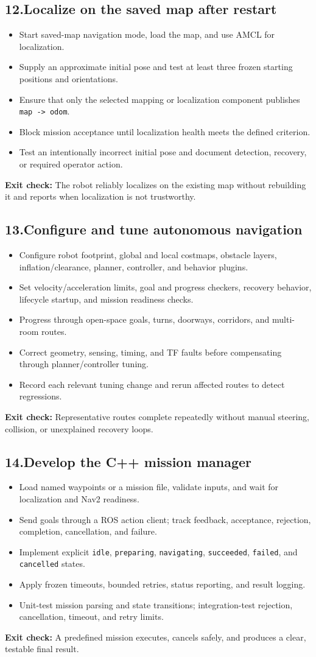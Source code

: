 \documentclass[10pt,a4paper]{article}
\newcommand{\cb}{\(\square\)}
\newcommand{\exitcheck}[1]{\vspace{2pt}\colorbox{PaleTeal}{\parbox{0.965\linewidth}{\textbf{Exit check:} #1}}}
\newcommand{\workstep}[2]{\subsection{\texorpdfstring{#1\quad #2}{#1\ #2}}}
\begin{document}
\workstep{12.}{Localize on the saved map after restart}
\begin{itemize}
  \item[\cb] Start saved-map navigation mode, load the map, and use AMCL for localization.
  \item[\cb] Supply an approximate initial pose and test at least three frozen starting positions and orientations.
  \item[\cb] Ensure that only the selected mapping or localization component publishes \texttt{map -> odom}.
  \item[\cb] Block mission acceptance until localization health meets the defined criterion.
  \item[\cb] Test an intentionally incorrect initial pose and document detection, recovery, or required operator action.
\end{itemize}
\exitcheck{The robot reliably localizes on the existing map without rebuilding it and reports when localization is not trustworthy.}

\workstep{13.}{Configure and tune autonomous navigation}
\begin{itemize}
  \item[\cb] Configure robot footprint, global and local costmaps, obstacle layers, inflation/clearance, planner, controller, and behavior plugins.
  \item[\cb] Set velocity/acceleration limits, goal and progress checkers, recovery behavior, lifecycle startup, and mission readiness checks.
  \item[\cb] Progress through open-space goals, turns, doorways, corridors, and multi-room routes.
  \item[\cb] Correct geometry, sensing, timing, and TF faults before compensating through planner/controller tuning.
  \item[\cb] Record each relevant tuning change and rerun affected routes to detect regressions.
\end{itemize}
\exitcheck{Representative routes complete repeatedly without manual steering, collision, or unexplained recovery loops.}

\workstep{14.}{Develop the C++ mission manager}
\begin{itemize}
  \item[\cb] Load named waypoints or a mission file, validate inputs, and wait for localization and Nav2 readiness.
  \item[\cb] Send goals through a ROS action client; track feedback, acceptance, rejection, completion, cancellation, and failure.
  \item[\cb] Implement explicit \texttt{idle}, \texttt{preparing}, \texttt{navigating}, \texttt{succeeded}, \texttt{failed}, and \texttt{cancelled} states.
  \item[\cb] Apply frozen timeouts, bounded retries, status reporting, and result logging.
  \item[\cb] Unit-test mission parsing and state transitions; integration-test rejection, cancellation, timeout, and retry limits.
\end{itemize}
\exitcheck{A predefined mission executes, cancels safely, and produces a clear, testable final result.}
\end{document}
